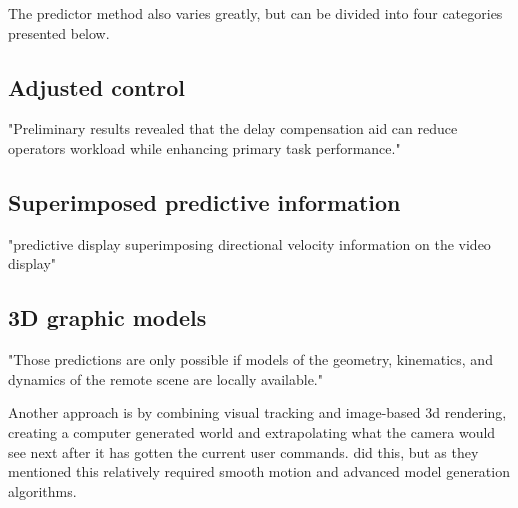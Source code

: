 The predictor method also varies greatly, but can be divided into four categories presented below.



\subsection{Adjusted control}

\citep{Lu2018} "Preliminary results revealed that the delay compensation aid can reduce operators workload while enhancing primary task performance."


\subsection{Superimposed predictive information}

\citep{Mathan1996} "predictive display superimposing directional
velocity information on the video display"

\subsection{3D graphic models}

\citep{Burkert2004} "Those predictions are only possible if models of the geometry, kinematics, and dynamics of the remote scene are locally available."

Another approach is by combining visual tracking and image-based 3d rendering, creating a computer generated world and extrapolating what the camera would see next after it has gotten the current user commands. \citep{Hu2015} did this, but as they mentioned this relatively required smooth motion and advanced model generation algorithms.


